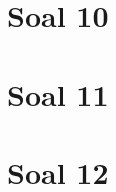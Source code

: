 \documentclass{article}
\begin{document}
    \section*{Soal 10}
        
    
    \section*{Soal 11}
        
    
    \section*{Soal 12}
        
        
    
\end{document}
